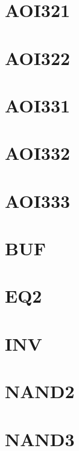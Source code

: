 \documentclass[10pt,a4paper,twoside]{report}
\begin{document}
\section{AOI321}

\clearpage

\section{AOI322}

\clearpage

\section{AOI331}

\clearpage

\section{AOI332}

\clearpage

\section{AOI333}

\clearpage

\section{BUF}

\clearpage

\section{EQ2}

\clearpage

\section{INV}

\clearpage

%

\section{NAND2}

\clearpage

\section{NAND3}

\clearpage
\end{document}
